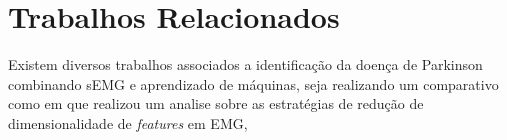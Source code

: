 \chapter[TrabalhosRelacionados]{Trabalhos Relacionados}
Existem diversos trabalhos associados a identificação da doença de Parkinson combinando sEMG e aprendizado de máquinas, seja realizando um comparativo como em \cite{liu2014feature} que realizou um analise sobre as estratégias de redução de dimensionalidade de \textit{features} em EMG, 